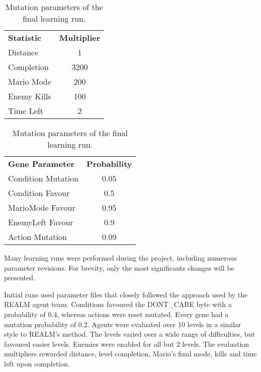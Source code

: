 \begin{table}
  \parbox{.45\linewidth}{
  \begin{center} \small
    \begin{tabular}{ | l | c | }
    \hline
    \textbf{Statistic} & \textbf{Multiplier} \TBstrut \\ \thickhline
    Distance & 1 \\ \hline
    Completion & 3200 \\ \hline
    Mario Mode & 200 \\ \hline
    Enemy Kills & 100 \\ \hline
    Time Left & 2 \\ \hline
    \end{tabular}
   \end{center}

  \caption{Evaluation multipliers of the final learning run.}
  \label{tab:multparams}
  }
  \hfill
  \parbox{.5\linewidth}{
  \begin{center} \small
    \begin{tabular}{ | l | c | }
    \hline
    \textbf{Gene Parameter} & \textbf{Probability} \TBstrut \\ \thickhline
    Condition Mutation & 0.05 \\ \hline
    Condition Favour & 0.5 \\ \hline
    MarioMode Favour & 0.95 \\ \hline
    EnemyLeft Favour & 0.9 \\ \hline
    Action Mutation & 0.09 \\ \hline
    \end{tabular}
  \end{center}
  \caption{Mutation parameters of the final learning run.}
  \label{tab:mutaparams}
}
\end{table}

Many learning runs were performed during the project, including numerous parameter revisions. For brevity, only the most significants changes will be presented.

Initial runs used parameter files that closely followed the approach used by the REALM agent team. Conditions favoured the {\footnotesize DONT\_CARE} byte with a probability of $0.4$, whereas actions were reset mutated. Every gene had a mutation probability of 0.2. Agents were evaluated over 10 levels in a similar style to REALM's method. The levels varied over a wide range of difficulties, but favoured easier levels. Enemies were enabled for all but 2 levels. The evaluation multipliers rewarded distance, level completion, Mario's final mode, kills and time left upon completion.

